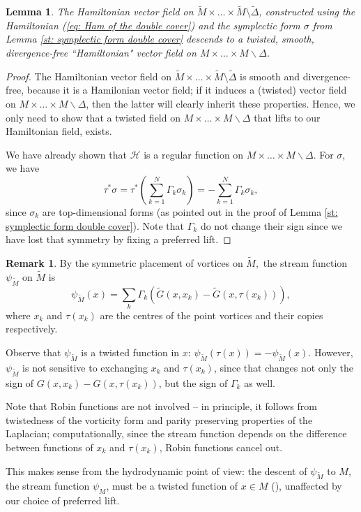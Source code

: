 \documentclass[11pt,twoside]{article}
\newtheorem{lem}[theorem]{Lemma}
\theoremstyle{definition}
\newtheorem{rem}[theorem]{Remark}
\numberwithin{equation}{section}
\def\Mt{\widetilde{M}}
\def\Gt{\widetilde{G}}
\begin{document}
\begin{lem}
    The Hamiltonian vector field on $\Mt\times\ldots\times\Mt\setminus\widetilde{\Delta}$, constructed using the Hamiltonian (\ref{eq: Ham of the double cover}) and the symplectic form $\sigma$ from Lemma \ref{st: symplectic form double cover} descends to a twisted, smooth, divergence-free ``Hamiltonian" vector field on $M\times\ldots\times M\backslash \Delta $.
\end{lem}
\begin{proof}
    The Hamiltonian vector field on $\Mt\times\ldots\times\Mt\setminus\widetilde{\Delta}$ is smooth and divergence-free, because it is a Hamilonian vector field; if it induces a (twisted) vector field on $M\times\ldots\times M\backslash \Delta $, then the latter will clearly inherit these properties. Hence, we only need to show that a twisted field on $M\times\ldots\times M\backslash \Delta $ that lifts to our Hamiltonian field, exists. 

We have already shown that $\mathcal{H}$ is a regular function on $M\times\ldots\times M\backslash \Delta $. For $\sigma$, we have
\[
\tau^{\ast}\sigma = \tau^{\ast}\left(\sum\limits_{k=1}^N\Gamma_k\sigma_k\right) = -\sum\limits_{k=1}^N\Gamma_k\sigma_k,
\]
since $\sigma_k$ are top-dimensional forms (as pointed out in the proof of Lemma \ref{st: symplectic form double cover}). Note that $\Gamma_k$ do not change their sign since we have lost that symmetry by fixing a preferred lift. 
\end{proof}
\begin{rem}

  By the symmetric placement of vortices on $\Mt,$ the stream function $\psi_{\widetilde{M}}$ on $\widetilde{M}$  is
\begin{equation}
\label{eq: stream function nonoritentable}
\psi_{\widetilde{M}}(x) = \sum_k\Gamma_k\left(\Gt(x,x_k) -\Gt(x,\tau(x_k)) \right),
\end{equation}
where $x_k$ and $\tau(x_k)$ are the centres of the point vortices and their copies respectively.



Observe that $\psi_{\Mt}$ is a twisted function in $x$: $\psi_{\Mt}\left(\tau(x)\right) = -\psi_{\Mt}(x)$. However, $\psi_{\Mt}$ is not sensitive to exchanging $x_k$ and $\tau(x_k)$, since that changes not only the sign of $G(x,x_k) -G(x,\tau(x_k))$, but the sign of $\Gamma_k$ as well.

Note that Robin functions are not involved -- in principle, it follows from twistedness of the vorticity form and parity preserving properties of the Laplacian; computationally, since the stream function depends on the difference between functions of $x_k$ and $\tau(x_k)$, Robin functions cancel out. 

This makes sense from the hydrodynamic point of view: the descent of $\psi_{\Mt}$ to $M$, the stream function $\psi_M$, must be a twisted function of $x\in M$ (\cite{vanneste2021vortex}), unaffected by our choice of preferred lift.
\end{rem}
\end{document}
